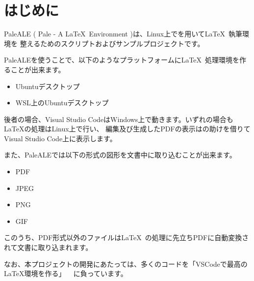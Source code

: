 \chapter*{はじめに}
\label{sec:preface}

PaleALE ( Pale - A \LaTeX\ Environment )は、Linux上でを用いて\LaTeX\ 執筆環境を
整えるためのスクリプトおよびサンプルプロジェクトです。

PaleALEを使うことで、以下のようなプラットフォームに\LaTeX\ 処理環境を作ることが出来ます。
\begin{itemize}
  \item Ubuntuデスクトップ
  \item WSL上のUbuntuデスクトップ
\end{itemize}
後者の場合、Visual Studio CodeはWindows上で動きます。いずれの場合もLaTeXの処理はLinux上で行い、
編集及び生成したPDFの表示はの助けを借りてVisual Studio Code上に表示します。

また、PaleALEでは以下の形式の図形を文書中に取り込むことが出来ます。
\begin{itemize}
  \item PDF
  \item JPEG
  \item PNG
  \item GIF
\end{itemize}
このうち、PDF形式以外のファイルは\LaTeX\ の処理に先立ちPDFに自動変換されて文書に取り込まれます。


なお、本プロジェクトの開発にあたっては、多くのコードを「VSCodeで最高のLaTeX環境を作る」
~\cite{best_latex_env}
に負っています。